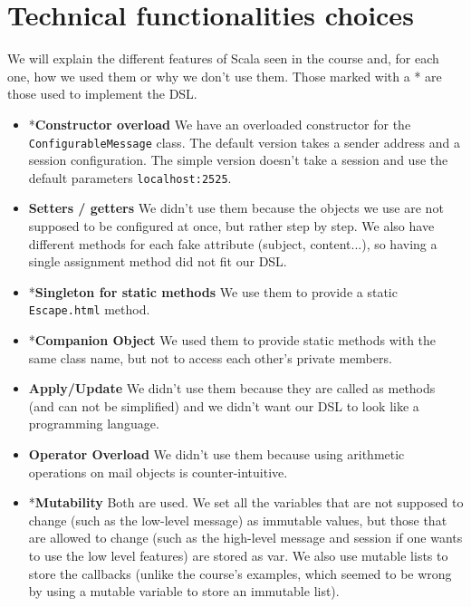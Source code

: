 \documentclass[10pt,a4paper]{article}
\begin{document}
\section{Technical functionalities choices}

	We will explain the different features of Scala seen in the course and, for each one, how we used them or why we don't use them. Those marked with a * are those used to implement the DSL.

	\begin{itemize}
		\item *\textbf{Constructor overload} We have an overloaded constructor for the \texttt{ConfigurableMessage} class. The default version takes a sender address and a session configuration. The simple version doesn't take a session and use the default parameters \texttt{localhost:2525}.
		
		\item \textbf{Setters / getters} We didn't use them because the objects we use are not supposed to be configured at once, but rather step by step. We also have different methods for each fake attribute (subject, content...), so having a single assignment method did not fit our DSL.
		
		\item *\textbf{Singleton for static methods} We use them to provide a static \texttt{Escape.html} method.
		
		\item *\textbf{Companion Object} We used them to provide static methods with the same class name, but not to access each other's private members.
		
		\item \textbf{Apply/Update} We didn't use them because they are called as methods (and can not be simplified) and we didn't want our DSL to look like a programming language.
		
		\item \textbf{Operator Overload} We didn't use them because using arithmetic operations on mail objects is counter-intuitive.
		
		\item *\textbf{Mutability} Both are used. We set all the variables that are not supposed to change (such as the low-level message) as immutable values, but those that are allowed to change (such as the high-level message and session if one wants to use the low level features) are stored as var. We also use mutable lists to store the callbacks (unlike the course's examples, which seemed to be wrong by using a mutable variable to store an immutable list).
		

\end{itemize}
\end{document}
